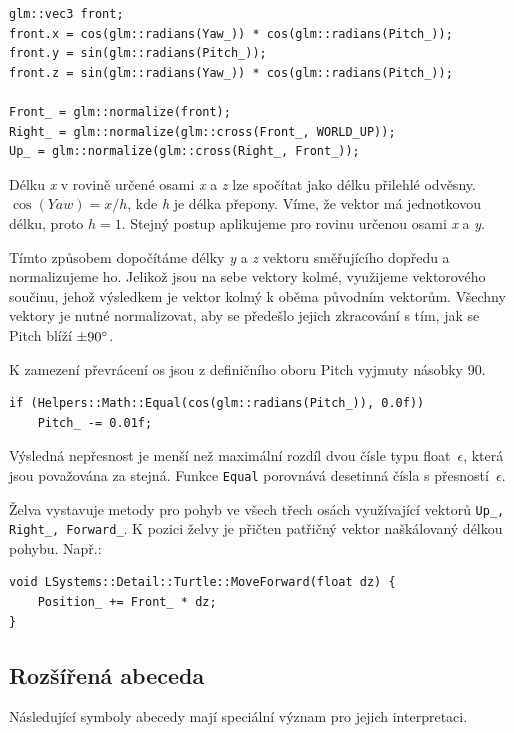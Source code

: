 \documentclass[thesis=M,czech]{FITthesis}[2019/12/23]
\begin{document}
\begin{verbatim}
glm::vec3 front;
front.x = cos(glm::radians(Yaw_)) * cos(glm::radians(Pitch_));
front.y = sin(glm::radians(Pitch_));
front.z = sin(glm::radians(Yaw_)) * cos(glm::radians(Pitch_));

Front_ = glm::normalize(front);
Right_ = glm::normalize(glm::cross(Front_, WORLD_UP));
Up_ = glm::normalize(glm::cross(Right_, Front_));
\end{verbatim}

Délku \textit{x} v rovině určené osami \textit{x} a \textit{z} lze spočítat jako délku přilehlé odvěsny. $\cos(Yaw) = x / h$, kde \textit{h} je délka přepony. Víme, že vektor má jednotkovou délku, proto $h = 1$. Stejný postup aplikujeme pro rovinu určenou osami \textit{x} a \textit{y}.

Tímto způsobem dopočítáme délky \textit{y} a \textit{z} vektoru směřujícího dopředu a normalizujeme ho. Jelikož jsou na sebe vektory kolmé, využijeme vektorového součinu, jehož výsledkem je vektor kolmý k oběma původním vektorům. Všechny vektory je nutné normalizovat, aby se předešlo jejich zkracování s tím, jak se Pitch blíží $\pm 90\degree$.

K zamezení převrácení os jsou z definičního oboru Pitch vyjmuty násobky 90\degree.

\begin{verbatim}
if (Helpers::Math::Equal(cos(glm::radians(Pitch_)), 0.0f))
    Pitch_ -= 0.01f;
\end{verbatim}

Výsledná nepřesnost je menší než maximální rozdíl dvou čísle typu float~$\epsilon$, která jsou považována za stejná. Funkce \texttt{Equal} porovnává desetinná čísla s přesností~$\epsilon$.

Želva vystavuje metody pro pohyb ve všech třech osách využívající vektorů \texttt{Up\_, Right\_, Forward\_}. K pozici želvy je přičten patřičný vektor naškálovaný délkou pohybu. Např.:

\begin{verbatim}
void LSystems::Detail::Turtle::MoveForward(float dz) {
    Position_ += Front_ * dz;
}
\end{verbatim}

\subsection{Rozšířená abeceda}
Následující symboly abecedy mají speciální význam pro jejich interpretaci.
\end{document}
